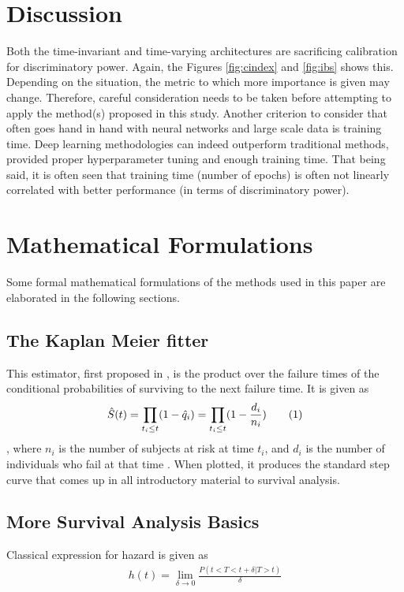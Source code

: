 \documentclass[%
 twocolumn,
 reprint,
 amsmath,amssymb,
 aps,nofootinbib
]{revtex4-2}
\newcommand\numberthis{\addtocounter{equation}{1}\tag{\theequation}} %
\begin{document}
\section{\label{disc}Discussion}
Both the time-invariant and time-varying architectures are sacrificing calibration for discriminatory power. Again, the Figures \ref{fig:cindex} and \ref{fig:ibs} shows this. Depending on the situation, the metric to which more importance is given may change. Therefore, careful consideration needs to be taken before attempting to apply the method(s) proposed in this study. Another criterion to consider that often goes hand in hand with neural networks and large scale data is training time. Deep learning methodologies can indeed outperform traditional methods, provided proper hyperparameter tuning and enough training time. That being said, it is often seen that training time (number of epochs) is often not linearly correlated with better performance (in terms of discriminatory power).



\appendix

\section{\label{appdx}Mathematical Formulations}

Some formal mathematical formulations of the methods used in this paper are elaborated in the following sections.

\subsection{\label{app:non_param}The Kaplan Meier fitter}

This estimator, first proposed in \cite{km_curve}, is the product over the failure times of the conditional probabilities of surviving to the next failure time. It is given as
\[
\hat{S}(t) = \prod_{t_i \le t}(1 - \hat{q}_i) = \prod_{t_i \le t}(1 - \frac{d_i}{n_i}) \numberthis  \label{eq:km}
\],
where $n_i$ is the number of subjects at risk at time $t_i$, and $d_i$ is the number of individuals who fail at that time \cite{Moore_2016}. When plotted, it produces the standard step curve that comes up in all introductory material to survival analysis.

\subsection{\label{app:more_basics}More Survival Analysis Basics}
Classical expression for hazard is given as
\begin{align}
h(t) = \lim_{\delta\to0}\frac{P(t<T<t+\delta|T>t)}{\delta} \label{eq:haz}
\end{align}
\end{document}
